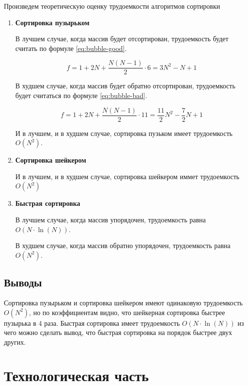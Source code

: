 \documentclass[a4paper,12pt]{article}
\begin{document}
Произведем теоретическую оценку трудоемкости алгоритмов сортировки

\begin{enumerate}
    \item \textbf{Сортировка пузырьком}

        В лучшем случае, когда массив будет отсортирован, трудоемкость будет считать
        по формуле \ref{eq:bubble-good}.

        \begin{equation}\label{eq:bubble-good}
            f = 1 + 2N + \frac{N(N-1)}{2} \cdot 6 =
            3N^2 - N + 1
        \end{equation}

        В худшем случае, когда массив будет обратно отсортирован, трудоемкость будет
        считаться по формуле \ref{eq:bubble-bad}.

        \begin{equation}\label{eq:bubble-bad}
            f = 1 + 2N + \frac{N(N-1)}{2} \cdot 11 =
            \frac{11}{2}N^2 - \frac{7}{2}N + 1
        \end{equation}

        И в лучшем, и в худшем случае, сортировка пузьком имеет трудоемкость $O(N^2)$.

    \item \textbf{Сортировка шейкером} \cite{knuth}

        И в лучшем, и в худшем случае, сортировка шейкером иммет трудоемкость $O(N^2)$

    \item \textbf{Быстрая сортировка} \cite{knuth}

        В лучшем случае, когда массив упорядочен, трудоемкость равна $O(N \cdot \ln(N))$.

        В худшем случае, когда массив обратно упорядочен, трудоемкость равна $O(N^2)$.
\end{enumerate}

\subsection{Выводы}

Сортировка пузырьком и сортировка шейкером имеют одинаковую трудоемкость $O(N^2)$, но
по коэффициентам видно, что шейкерная сортировка быстрее пузырька в 4 раза. Быстрая
сортировка имеет трудоемкость $O(N \cdot \ln(N))$ из чего можно сделать вывод, что
быстрая сортировка на порядок быстрее двух других.

\newpage
\section{Технологическая часть}
\end{document}
